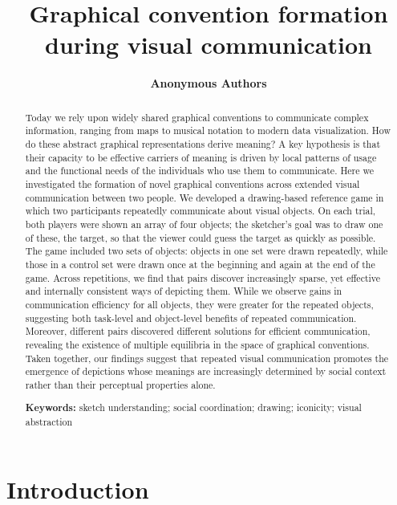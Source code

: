 \documentclass[10pt,letterpaper]{article}
\title{Graphical convention formation during visual communication}
\author{\large \bf Anonymous Authors}
\begin{document}
\maketitle

\begin{abstract}
Today we rely upon widely shared graphical conventions to communicate complex information, ranging from maps to musical notation to modern data visualization. 
How do these abstract graphical representations derive meaning? 
A key hypothesis is that their capacity to be effective carriers of meaning is driven by local patterns of usage and the functional needs of the individuals who use them to communicate. 
Here we investigated the formation of novel graphical conventions across extended visual communication between two people. 
We developed a drawing-based reference game in which two participants repeatedly communicate about visual objects. 
On each trial, both players were shown an array of four objects; the sketcher’s goal was to draw one of these, the target, so that the viewer could guess the target as quickly as possible. 
The game included two sets of objects: objects in one set were drawn repeatedly, while those in a control set were drawn once at the beginning and again at the end of the game. 
Across repetitions, we find that pairs discover increasingly sparse, yet effective and internally consistent ways of depicting them. 
While we observe gains in communication efficiency for all objects, they were greater for the repeated objects, suggesting both task-level and object-level benefits of repeated communication. 
Moreover, different pairs discovered different solutions for efficient communication, revealing the existence of multiple equilibria in the space of graphical conventions. 
Taken together, our findings suggest that repeated visual communication promotes the emergence of depictions whose meanings are increasingly determined by social context rather than their perceptual properties alone.

\textbf{Keywords:}
sketch understanding; social coordination; drawing; iconicity; visual abstraction

\end{abstract}

\section{Introduction}
\end{document}
